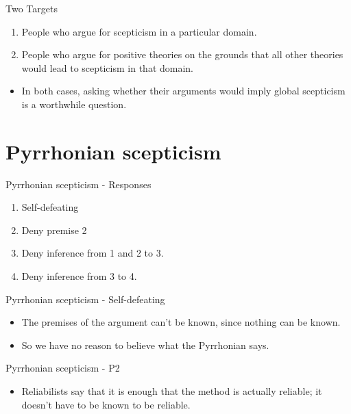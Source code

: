 \documentclass[
  17pt,
  letterpaper,
  ignorenonframetext,
  aspectratio=169,
]{beamer}
\providecommand{\tightlist}{%
  \setlength{\itemsep}{0pt}\setlength{\parskip}{0pt}}\usepackage{longtable,booktabs,array}
\begin{document}
\begin{frame}{Two Targets}
\protect\hypertarget{two-targets}{}
\begin{enumerate}[<+->]
\tightlist
\item
  People who argue for scepticism in a particular domain.
\item
  People who argue for positive theories on the grounds that all other
  theories would lead to scepticism in that domain.
\end{enumerate}

\begin{itemize}[<+->]
\tightlist
\item
  In both cases, asking whether their arguments would imply global
  scepticism is a worthwhile question.
\end{itemize}
\end{frame}

\hypertarget{pyrrhonian-scepticism-1}{%
\section{Pyrrhonian scepticism}\label{pyrrhonian-scepticism-1}}

\begin{frame}{Pyrrhonian scepticism - Responses}
\protect\hypertarget{pyrrhonian-scepticism---responses}{}
\begin{enumerate}[<+->]
\tightlist
\item
  Self-defeating
\item
  Deny premise 2
\item
  Deny inference from 1 and 2 to 3.
\item
  Deny inference from 3 to 4.
\end{enumerate}
\end{frame}

\begin{frame}{Pyrrhonian scepticism - Self-defeating}
\protect\hypertarget{pyrrhonian-scepticism---self-defeating}{}
\begin{itemize}[<+->]
\tightlist
\item
  The premises of the argument can't be known, since nothing can be
  known.
\item
  So we have no reason to believe what the Pyrrhonian says.
\end{itemize}
\end{frame}

\begin{frame}{Pyrrhonian scepticism - P2}
\protect\hypertarget{pyrrhonian-scepticism---p2}{}
\begin{itemize}[<+->]
\tightlist
\item
  Reliabilists say that it is enough that the method is actually
  reliable; it doesn't have to be known to be reliable.
\end{itemize}
\end{frame}
\end{document}
